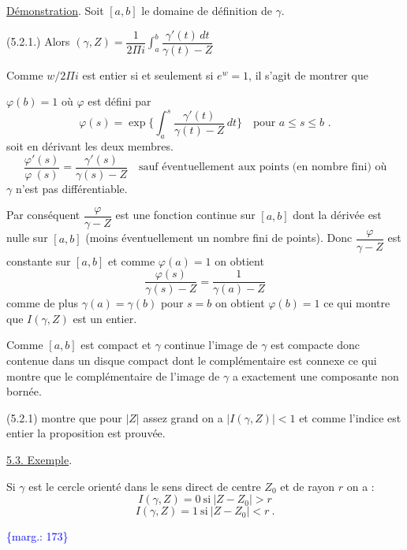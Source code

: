 \documentclass[11pt]{article}
\newcommand{\scanpage}[1]{\par\bigskip\noindent{\small\sffamily[scan #1]}\par}
\newcommand{\mspage}[1]{{\small\sffamily[p.\,#1]}}
\newcommand{\margin}[1]{\textcolor{blue}{\{\textsf{marg.:} #1\}}}
\newcommand{\uline}[1]{\underline{#1}}
\begin{document}
\clearpage
\scanpage{119/173}
\mspage{- 12 -}

\uline{Démonstration}. Soit $[a,b]$ le domaine de définition de $\gamma$.

(5.2.1.) Alors $(\gamma,Z) = \dfrac{1}{2\Pi i}\displaystyle\int_a^b \dfrac{\gamma'(t)\,dt}{\gamma(t) - Z}$

Comme $w/2\Pi i$ est entier si et seulement si $e^{w} = 1$, il s'agit de montrer que

$\varphi(b) = 1$ où $\varphi$ est défini par
\[ \varphi(s) = \exp \{ \int_a^s \frac{\gamma'(t)}{\gamma(t)-Z}\,dt\} \quad \text{pour } a \leq s \leq b \text{ .} \]
soit en dérivant les deux membres.
\[ \frac{\varphi'(s)}{\varphi\ (s)} = \frac{\gamma'(s)}{\gamma(s)-Z} \quad \text{sauf éventuellement aux points (en nombre fini) où} \]
$\gamma$ n'est pas différentiable.

Par conséquent $\dfrac{\varphi}{\gamma-Z}$ est une fonction continue sur $[a,b]$ dont la dérivée est
nulle sur $[a,b]$ (moins éventuellement un nombre fini de points). Donc $\dfrac{\varphi}{\gamma-Z}$
est constante sur $[a,b]$ et comme $\varphi(a) = 1$ on obtient
\[ \frac{\varphi(s)}{\gamma(s) - Z} = \frac{1}{\gamma(a) - Z} \]
comme de plus $\gamma(a) = \gamma(b)$ pour $s = b$ on obtient $\varphi(b) = 1$ ce qui montre
que $I(\gamma,Z)$ est un entier.

Comme $[a,b]$ est compact et $\gamma$ continue l'image de $\gamma$ est compacte
donc contenue dans un disque compact dont le complémentaire est connexe ce
qui montre que le complémentaire de l'image de $\gamma$ a exactement une composante
non bornée.

(5.2.1) montre que pour $|Z|$ assez grand on a $|I(\gamma,Z)| < 1$ et comme
l'indice est entier la proposition est prouvée.

\uline{5.3. Exemple}.

Si $\gamma$ est le cercle orienté dans le sens direct de centre $Z_0$ et
de rayon $r$ on a :
\[ I(\gamma,Z) = 0 \ \text{si}\ |Z - Z_0| > r \]
\[ I(\gamma,Z) = 1 \ \text{si}\ |Z - Z_0| < r \ . \]

\margin{173}

\clearpage
\scanpage{119/174}
\mspage{- 13 -}
\end{document}
